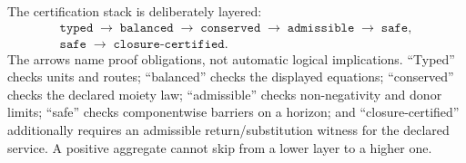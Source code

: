 \documentclass[11pt]{article}
\begin{document}
The certification stack is deliberately layered:
\begin{equation}
\begin{gathered}
\texttt{typed}\;\longrightarrow\;\texttt{balanced}\;\longrightarrow\;\texttt{conserved}\;\longrightarrow\;\texttt{admissible}\;\longrightarrow\;\texttt{safe},\\[-2pt]
\texttt{safe}\;\longrightarrow\;\texttt{closure-certified}.
\end{gathered}
\label{eq:certification-stack}
\end{equation}
The arrows name proof obligations, not automatic logical implications. ``Typed'' checks units and routes; ``balanced'' checks the displayed equations; ``conserved'' checks the declared moiety law; ``admissible'' checks non-negativity and donor limits; ``safe'' checks componentwise barriers on a horizon; and ``closure-certified'' additionally requires an admissible return/substitution witness for the declared service. A positive aggregate cannot skip from a lower layer to a higher one.
\end{document}
